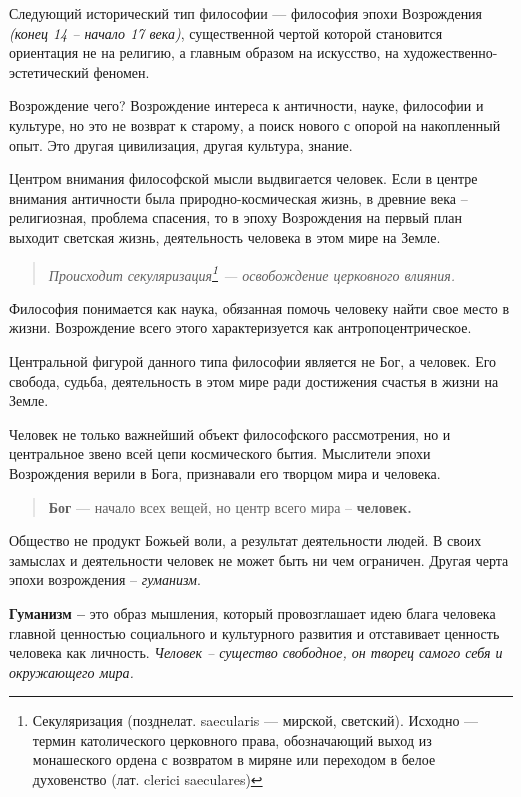 \documentclass[a4paper, 14pt]{extreport}
\begin{document}
Следующий исторический тип философии --- философия эпохи Возрождения
\emph{(конец 14 -- начало 17 века)}, существенной чертой которой
становится ориентация не на религию, а главным образом на искусство, на
художественно-эстетический феномен.

Возрождение чего? Возрождение интереса к античности, науке, философии и
культуре, но это не возврат к старому, а поиск нового с опорой на
накопленный опыт. Это другая цивилизация, другая культура, знание.

Центром внимания философской мысли выдвигается человек. Если в центре
внимания античности была природно-космическая жизнь, в древние века --
религиозная, проблема спасения, то в эпоху Возрождения на первый план
выходит светская жизнь, деятельность человека в этом мире на Земле.

\begin{quote}
\emph{Происходит секуляризация\footnote{Секуляризация (позднелат.
  saecularis --- мирской, светский). Исходно --- термин католического
  церковного права, обозначающий выход из монашеского ордена с возвратом
  в миряне или переходом в белое духовенство (лат. clerici saeculares)}
--- освобождение церковного влияния.}
\end{quote}

Философия понимается как наука, обязанная помочь человеку найти свое
место в жизни. Возрождение всего этого характеризуется как
антропоцентрическое.

Центральной фигурой данного типа философии является не Бог, а человек.
Его свобода, судьба, деятельность в этом мире ради достижения счастья в
жизни на Земле.

Человек не только важнейший объект философского рассмотрения, но и
центральное звено всей цепи космического бытия. Мыслители эпохи
Возрождения верили в Бога, признавали его творцом мира и человека.

\begin{quote}
\textbf{Бог} --- начало всех вещей, но центр всего мира --
\textbf{человек.}
\end{quote}

Общество не продукт Божьей воли, а результат деятельности людей. В своих
замыслах и деятельности человек не может быть ни чем ограничен. Другая
черта эпохи возрождения -- \emph{гуманизм}.

\textbf{Гуманизм --}
это образ мышления, который провозглашает идею блага человека главной
ценностью социального и культурного развития и отставивает ценность
человека как личность. \emph{Человек -- существо свободное, он творец
самого себя и окружающего мира.}
\end{document}

